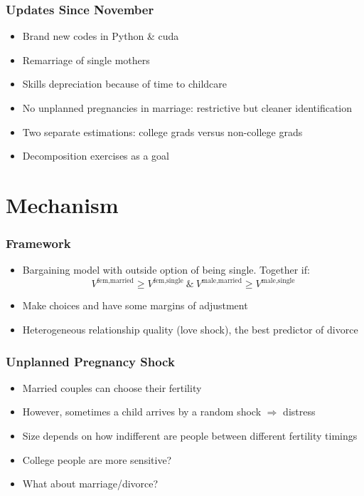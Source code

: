 \documentclass{beamer}
\begin{document}
\begin{frame}
\frametitle{Updates Since November}
\begin{itemize}
\item Brand new codes in Python \& cuda
\item Remarriage of single mothers
\item Skills depreciation because of time to childcare
\item No unplanned pregnancies in marriage: restrictive but cleaner identification
\item Two separate estimations: college grads versus non-college grads
\item Decomposition exercises as a goal
\end{itemize}
\end{frame}



\section{Mechanism}

\begin{frame}
\frametitle{Framework}
\begin{itemize}
\item Bargaining model with outside option of being single. Together if:
\[V^{\text{fem},\text{married}} \geq V^{\text{fem},\text{single}} \ \& \ V^{\text{male},\text{married}} \geq V^{\text{male},\text{single}}\]
\item Make choices and have some margins of adjustment
\item Heterogeneous relationship quality (love shock), the best predictor of divorce
\end{itemize}
\end{frame}


\begin{frame}
\frametitle{Unplanned Pregnancy Shock}
\begin{itemize}
\item Married couples can choose their fertility
\item However, sometimes a child arrives by a random shock $\Rightarrow$ distress
\item Size depends on how indifferent are people between different fertility timings
\item College people are more sensitive?
\item What about marriage/divorce?
\end{itemize}
\end{frame}
\end{document}
